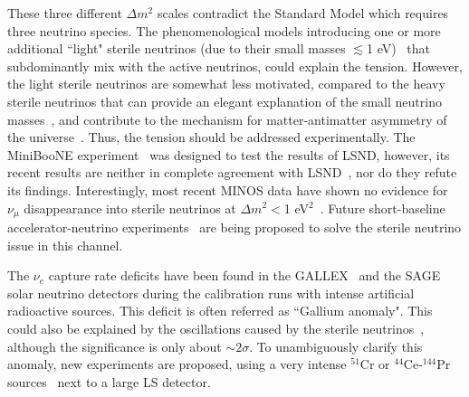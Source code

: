 These three different $\Delta m^2$ scales 
contradict the Standard Model which requires three neutrino species. The phenomenological models introducing one or more additional ``light" sterile neutrinos (due to their small masses $\lesssim$1 eV)~\cite{Serel04} 
that subdominantly mix with the active neutrinos, could explain the tension. However, the light sterile neutrinos are somewhat
less motivated, compared to the heavy sterile neutrinos that can provide an elegant explanation of the small neutrino masses~\cite{SeeSaw}, and contribute to the mechanism for matter-antimatter asymmetry of the universe~\cite{leptogenesis}. Thus, the tension should be addressed experimentally. The MiniBooNE experiment~\cite{MiniBooNE2007} was 
designed to test the results of LSND, however,  its recent results 
are neither in complete agreement with LSND~\cite{MiniBooNE2013}, nor do they refute its findings. Interestingly, most recent MINOS data have shown no evidence for $\nu_\mu$ disappearance into sterile neutrinos at $\Delta m^2<$1 eV$^2$~\cite{Sousa-Neutrino14}.  Future short-baseline accelerator-neutrino experiments~\cite{nuSTORM,IsoDAR} are being proposed to solve the sterile neutrino issue in this channel.



The $\nu_e$ capture rate deficits have been found in the GALLEX~\cite{GALLEX,GALLEX2010} and the SAGE~\cite{SAGE,SAGE2009} solar neutrino detectors 
during the calibration runs with intense artificial radioactive sources. This deficit is often referred as ``Gallium anomaly". This could also be explained by the oscillations caused by the sterile neutrinos~\cite{Guinti2010}, although the significance is only about $\sim2\sigma$. To unambiguously clarify this anomaly, new experiments are proposed, using a very intense $^{51}$Cr or $^{44}$Ce-$^{144}$Pr sources~\cite{Cribier2011,Dwyer2013,SOX,CeLAND} next to a large LS detector.

